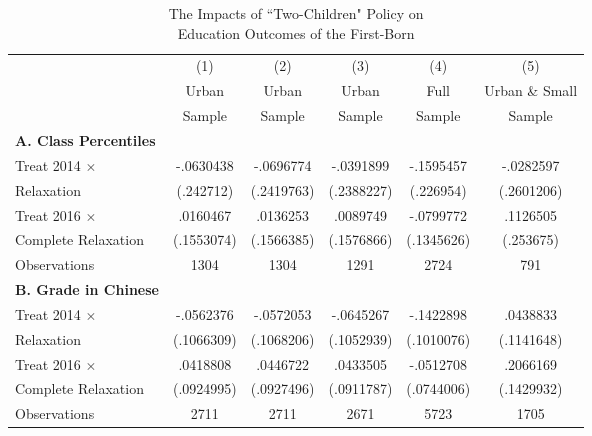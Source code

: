 \documentclass[12pt]{extarticle}
\begin{document}
\begin{table}
\centering
\caption{The Impacts of ``Two-Children" Policy on \\ Education Outcomes of the First-Born} \label{tab:childeduc}
\begin{threeparttable}
\def\sym#1{\ifmmode^{#1}\else\(^{#1}\)\fi}
\begin{tabular}{l*{5}{c}}
\hline\hline
                    &\multicolumn{1}{c}{(1)}&\multicolumn{1}{c}{(2)}&\multicolumn{1}{c}{(3)}&\multicolumn{1}{c}{(4)}&\multicolumn{1}{c}{(5)}\\
	                &\multicolumn{1}{c}{Urban}&\multicolumn{1}{c}{Urban}&\multicolumn{1}{c}{Urban}&\multicolumn{1}{c}{Full}&\multicolumn{1}{c}{Urban \& Small}\\
		&\multicolumn{1}{c}{Sample}&\multicolumn{1}{c}{Sample}&\multicolumn{1}{c}{Sample}&\multicolumn{1}{c}{Sample}&\multicolumn{1}{c}{Sample}\\
\hline

\textbf{A. Class Percentiles} \\
Treat 2014 $\times$ &   -.0630438   &   -.0696774   &   -.0391899   &   -.1595457   &   -.0282597   \\
\quad 2014 Relaxation     &   (.242712)   &  (.2419763)   &  (.2388227)   &   (.226954)   &  (.2601206)   \\
Treat 2016 $\times$ &    .0160467   &    .0136253   &    .0089749   &   -.0799772   &    .1126505   \\
\quad Complete Relaxation &  (.1553074)   &  (.1566385)   &  (.1576866)   &  (.1345626)   &   (.253675)   \\
Observations        &        1304   &        1304   &        1291   &        2724   &         791   \\

\textbf{B. Grade in Chinese} \\
Treat 2014 $\times$ &   -.0562376   &   -.0572053   &   -.0645267   &   -.1422898   &    .0438833   \\
\quad 2014 Relaxation     &  (.1066309)   &  (.1068206)   &  (.1052939)   &  (.1010076)   &  (.1141648)   \\
Treat 2016 $\times$ &    .0418808   &    .0446722   &    .0433505   &   -.0512708   &    .2066169   \\
\quad Complete Relaxation &  (.0924995)   &  (.0927496)   &  (.0911787)   &  (.0744006)   &  (.1429932)   \\
Observations        &        2711   &        2711   &        2671   &        5723   &        1705   \\
                   

\end{tabular}
\end{threeparttable}
\end{table}
\end{document}
